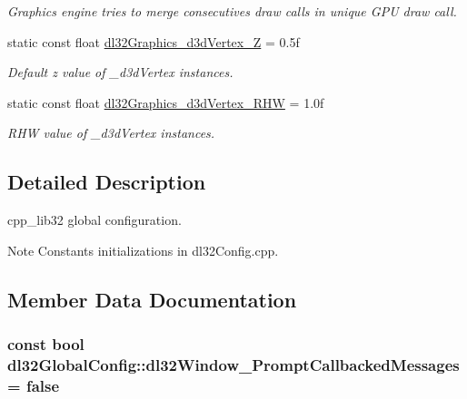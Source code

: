 \begin{DoxyCompactItemize}
\begin{DoxyCompactList}\small\item\em Graphics engine tries to merge consecutives draw calls in unique G\-P\-U draw call. \end{DoxyCompactList}\item 
\hypertarget{classdl32_global_config_a208c705e86327ee5caa91c3f45001ded}{static const float \hyperlink{classdl32_global_config_a208c705e86327ee5caa91c3f45001ded}{dl32\-Graphics\-\_\-d3d\-Vertex\-\_\-\-Z} = 0.\-5f}\label{classdl32_global_config_a208c705e86327ee5caa91c3f45001ded}

\begin{DoxyCompactList}\small\item\em Default z value of \-\_\-d3d\-Vertex instances. \end{DoxyCompactList}\item 
\hypertarget{classdl32_global_config_a96f4f31408773016832d4a858cf34e79}{static const float \hyperlink{classdl32_global_config_a96f4f31408773016832d4a858cf34e79}{dl32\-Graphics\-\_\-d3d\-Vertex\-\_\-\-R\-H\-W} = 1.\-0f}\label{classdl32_global_config_a96f4f31408773016832d4a858cf34e79}

\begin{DoxyCompactList}\small\item\em R\-H\-W value of \-\_\-d3d\-Vertex instances. \end{DoxyCompactList}\end{DoxyCompactItemize}


\subsection{Detailed Description}
cpp\-\_\-lib32 global configuration. 

\begin{DoxyNote}{Note}
Constants initializations in dl32\-Config.\-cpp. 
\end{DoxyNote}


\subsection{Member Data Documentation}
\hypertarget{classdl32_global_config_ade572692362bae4fe17bf120425e0175}{
\subsubsection[{dl32\-Window\-\_\-\-Prompt\-Callbacked\-Messages}]{\setlength{\rightskip}{0pt plus 5cm}const bool dl32\-Global\-Config\-::dl32\-Window\-\_\-\-Prompt\-Callbacked\-Messages = false\hspace{0.3cm}{\ttfamily [static]}}}\label{classdl32_global_config_ade572692362bae4fe17bf120425e0175}


